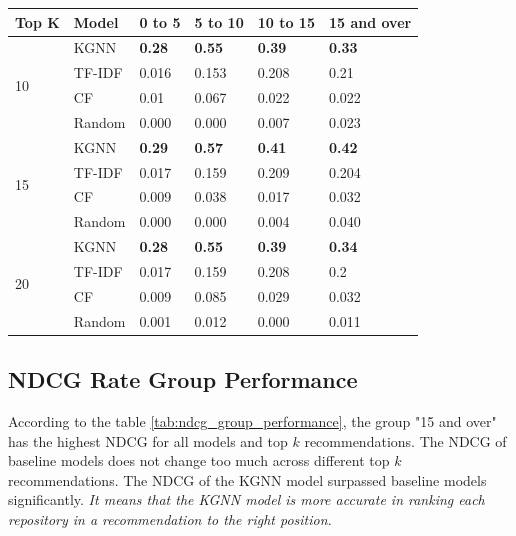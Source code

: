 \documentclass[11pt,twoside]{report}
\begin{document}
\begin{center}
    \begin{tabular}{l | l | l | l | l | l}
    \hline
    Top K & Model & 0 to 5 & 5 to 10 & 10 to 15 & 15 and over \\
    \hline
    \multirow{4}{*}{10} 
    & KGNN & \textbf{0.28} & \textbf{0.55} & \textbf{0.39} & \textbf{0.33} \\
    & TF-IDF & 0.016 & 0.153 & 0.208 & 0.21 \\
    & CF & 0.01 & 0.067 & 0.022 & 0.022 \\
    & Random & 0.000 & 0.000 & 0.007 & 0.023 \\
    \hline
    \multirow{4}{*}{15}
    & KGNN & \textbf{0.29} & \textbf{0.57} & \textbf{0.41} & \textbf{0.42} \\
    & TF-IDF & 0.017 & 0.159 & 0.209 & 0.204 \\
    & CF & 0.009 & 0.038 & 0.017 & 0.032 \\
    & Random & 0.000 & 0.000 & 0.004 & 0.040 \\
    \hline
    \multirow{4}{*}{20}
    & KGNN & \textbf{0.28} & \textbf{0.55} & \textbf{0.39} & \textbf{0.34} \\
    & TF-IDF & 0.017 & 0.159 & 0.208 & 0.2 \\
    & CF & 0.009 & 0.085 & 0.029 & 0.032 \\
    & Random & 0.001 & 0.012 & 0.000 & 0.011 \\
    \end{tabular}
    \label{tab:mrr_group_performance}
\end{center}

\subsection{NDCG Rate Group Performance}
According to the table \ref{tab:ndcg_group_performance}, the group "15 and over" has the highest NDCG for all models and top $k$ recommendations. The NDCG of baseline models does not change too much across different top $k$ recommendations. The NDCG of the KGNN model surpassed baseline models significantly. \textit{It means that the KGNN model is more accurate in ranking each repository in a recommendation to the right position.}
\end{document}
